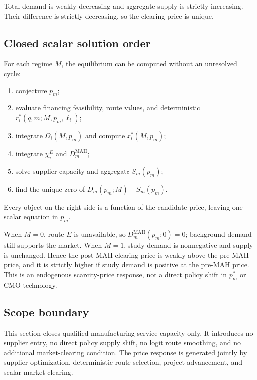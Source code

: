 Total demand is weakly decreasing and aggregate supply is strictly
increasing. Their difference is strictly decreasing, so the clearing price
is unique.

\subsection{Closed scalar solution order}
\label{subsec:p06-solution-order}

For each regime \(M\), the equilibrium can be computed without an unresolved
cycle:
\begin{enumerate}
  \item conjecture \(p_m\);
  \item evaluate financing feasibility, route values, and deterministic
  \(r_i^*(q,m;M,p_m,\ell_i)\);
  \item integrate \(\Omega_i(M,p_m)\) and compute \(x_i^*(M,p_m)\);
  \item integrate \(\chi_i^E\) and \(D_m^{\mathrm{MAH}}\);
  \item solve supplier capacity and aggregate \(S_m(p_m)\);
  \item find the unique zero of \(D_m(p_m;M)-S_m(p_m)\).
\end{enumerate}
Every object on the right side is a function of the candidate price, leaving
one scalar equation in \(p_m\).

When \(M=0\), route \(E\) is unavailable, so
\(D_m^{\mathrm{MAH}}(p_m;0)=0\); background demand still supports the market.
When \(M=1\), study demand is nonnegative and supply is unchanged. Hence the
post-MAH clearing price is weakly above the pre-MAH price, and it is strictly
higher if study demand is positive at the pre-MAH price. This is an endogenous
scarcity-price response, not a direct policy shift in \(p_m^*\) or CMO
technology.

\subsection{Scope boundary}
\label{subsec:p06-scope}

This section closes qualified manufacturing-service capacity only. It introduces
no supplier entry, no direct policy supply shift, no logit route smoothing,
and no additional market-clearing condition. The price response is generated
jointly by supplier optimization, deterministic route selection, project
advancement, and scalar market clearing.
